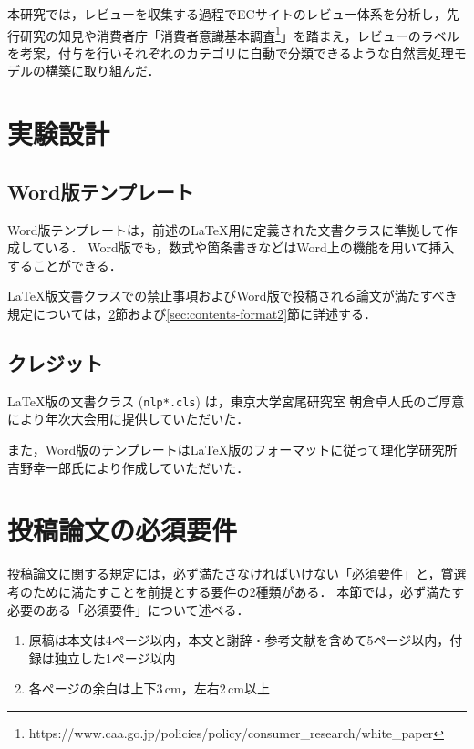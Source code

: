 \documentclass[
  platex, dvipdfmx,  %
]{nlp2024}
\newcommand{\code}[1]{\texttt{#1}}
\begin{document}
本研究では，レビューを収集する過程でECサイトのレビュー体系を分析し，先行研究\cite{Article_04, Article_05}の知見や消費者庁「消費者意識基本調査\footnote{https://www.caa.go.jp/policies/policy/consumer\_research/white\_paper}」を踏まえ，レビューのラベルを考案，付与を行いそれぞれのカテゴリに自動で分類できるような自然言処理モデルの構築に取り組んだ．

\section{実験設計}

\subsection{}

\subsection{Word版テンプレート}
Word版テンプレートは，前述のLaTeX用に定義された文書クラスに準拠して作成している．
Word版でも，数式や箇条書きなどはWord上の機能を用いて挿入することができる．

LaTeX版文書クラスでの禁止事項およびWord版で投稿される論文が満たすべき規定については，\ref{sec:contents-format1}節および\ref{sec:contents-format2}節に詳述する．


\subsection{クレジット}
LaTeX版の文書クラス (\code{nlp*.cls}) は，東京大学宮尾研究室 朝倉卓人氏のご厚意により年次大会用に提供していただいた．

また，Word版のテンプレートはLaTeX版のフォーマットに従って理化学研究所 吉野幸一郎氏により作成していただいた．




\section{投稿論文の必須要件}
\label{sec:contents-format1}

投稿論文に関する規定には，必ず満たさなければいけない「必須要件」と，賞選考のために満たすことを前提とする要件の2種類がある．
本節では，必ず満たす必要のある「必須要件」について述べる．

\begin{enumerate}
\item 原稿は本文は4ページ以内，本文と謝辞・参考文献を含めて5ページ以内，付録は独立した1ページ以内
\item 各ページの余白は上下3\,cm，左右2\,cm以上
\end{enumerate}
\end{document}
